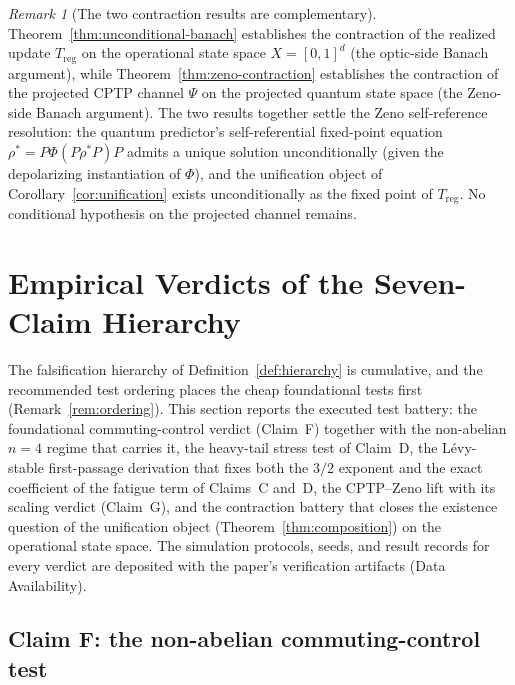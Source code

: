 \documentclass[11pt,a4paper]{article}
\theoremstyle{plain}
\theoremstyle{definition}
\theoremstyle{remark}
\newtheorem{remark}[theorem]{Remark}
\begin{document}
\begin{remark}[The two contraction results are complementary]
\label{rem:two-contractions}
Theorem~\ref{thm:unconditional-banach} establishes the contraction of
the realized update $T_{\mathrm{reg}}$ on the operational state space
$X=[0,1]^{d}$ (the optic-side Banach argument), while
Theorem~\ref{thm:zeno-contraction} establishes the contraction of the
projected CPTP channel $\Psi$ on the projected quantum state space
(the Zeno-side Banach argument). The two results together settle
the Zeno self-reference resolution: the quantum predictor's
self-referential fixed-point equation $\rho^{*}=P\Phi(P\rho^{*}P)P$
admits a unique solution unconditionally (given the depolarizing
instantiation of $\Phi$), and the unification object of
Corollary~\ref{cor:unification} exists unconditionally as the fixed
point of $T_{\mathrm{reg}}$. No conditional hypothesis on the
projected channel remains.
\end{remark}




\section{Empirical Verdicts of the Seven-Claim Hierarchy}\label{sec:verdicts}

The falsification hierarchy of Definition~\ref{def:hierarchy} is
cumulative, and the recommended test ordering places the cheap
foundational tests first (Remark~\ref{rem:ordering}). This section
reports the executed test battery: the foundational
commuting-control verdict (Claim~F) together with the non-abelian
$n=4$ regime that carries it, the heavy-tail stress test of
Claim~D, the L\'evy-stable first-passage derivation that fixes both
the $3/2$ exponent and the exact coefficient of the fatigue term of
Claims~C and~D, the CPTP--Zeno lift with its scaling verdict
(Claim~G), and the contraction battery that closes the existence
question of the unification object (Theorem~\ref{thm:composition})
on the operational state space. The simulation protocols, seeds,
and result records for every verdict are deposited with the paper's
verification artifacts (Data Availability).

\subsection{Claim F: the non-abelian commuting-control test}
\label{sec:verdict-f}
\end{document}

